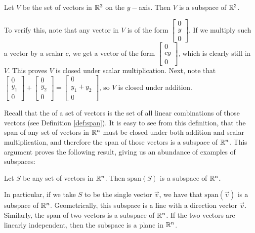 \documentclass{ximera}
\begin{document}
\begin{example} \label{y-axis_subspace}
Let $V$ be the set of vectors in $\mathbb{R}^3$ on the $y-$axis.  Then $V$ is a subspace of $\mathbb{R}^3$.  

\begin{explanation}
To verify this, note that any vector in $V$ is of the form $\begin{bmatrix}0\\y\\0 \end{bmatrix}$.  If we multiply such a vector by a scalar $c$, we get a vector of the form $\begin{bmatrix}0\\cy\\0 \end{bmatrix}$, which is clearly still in $V$.  This proves $V$ is closed under scalar multiplication.  Next, note that $\begin{bmatrix}0\\y_1\\0 \end{bmatrix} + \begin{bmatrix}0\\y_2\\0 \end{bmatrix}= \begin{bmatrix}0\\y_1 + y_2\\0\end{bmatrix}$, so $V$ is closed under addition.
\end{explanation}
\end{example}


Recall that the  of a set of vectors is the set of all linear combinations of those vectors (see Definition \ref{def:span}).  It is easy to see from this definition, that the span of any set of vectors in $\mathbb{R}^n$ must be closed under both addition and scalar multiplication, and therefore the span of those vectors is a subspace of $\mathbb{R}^n$.  This argument proves the following result, giving us an abundance of examples of subspaces:

\begin{theorem} \label{th:span_is_subspace}
Let $S$ be any set of vectors in $\mathbb{R}^n$.  Then $\mbox{span}(S)$ is a subspace of $\mathbb{R}^n$.
\end{theorem}

In particular, if we take $S$ to be the single vector $\vec{v}$, we have that $\text{span}(\vec{v})$ is a subspace of $\mathbb{R}^n$.  Geometrically, this subspace is a line with a direction vector $\vec{v}$.  Similarly, the span of two vectors is a subspace of $\mathbb{R}^n$.  If the two vectors are linearly independent, then the subspace is a plane in $\mathbb{R}^n$. 
\end{document}
